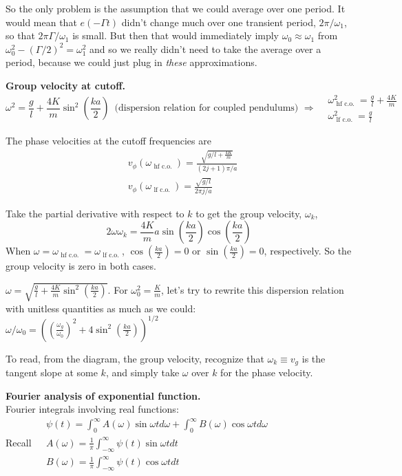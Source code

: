 \documentclass[twoside,10pt]{amsart}
\newcommand{\problemhead}[1]
  {\smallskip
   \noindent{\large\bf Problem #1.}
   \smallskip}
\begin{document}
So the only problem is the assumption that we could average over one period.  It would mean that $e(-\Gamma t)$ didn't change much over one transient period, $2\pi/\omega_1$, so that $2\pi \Gamma / \omega_1$ is small.  But then that would immediately imply $\omega_0 \approx \omega_1$ from $\omega_0^2 - (\Gamma/2)^2 = \omega_1^2$ and so we really didn't need to take the average over a period, because we could just plug in \emph{these} approximations.  

\problemhead{6.14} \textbf{ Group velocity at cutoff.} 
\[
\omega^2 = \frac{g}{l} + \frac{4K}{m} \sin^2{\left( \frac{ka}{2} \right) } \, \text{ (dispersion relation for coupled pendulums) } \Longrightarrow \begin{aligned}
  & \omega_{\text{ hf c.o. } }^2 = \frac{g}{l} + \frac{4K}{m} \\
  & \omega_{\text{ lf c.o. } }^2 = \frac{g}{l} 
\end{aligned}
\]

The phase velocities at the cutoff frequencies are
\[
\begin{aligned}
  & v_{\phi}(\omega_{ \text{ hf c.o. } }) = \frac{ \sqrt{ g/l + \frac{4K}{m} } }{ (2j+1)\pi/a } \\
  & v_{\phi}(\omega_{ \text{ lf c.o. } }) = \frac{ \sqrt{g/l}}{ 2\pi j /a} 
\end{aligned}
\]

Take the partial derivative with respect to $k$ to get the group velocity, $\omega_k$,
\[
2 \omega \omega_k = \frac{4K}{m} a \sin{ \left( \frac{ka}{2} \right)} \cos{ \left( \frac{ka}{2} \right)} 
\]
When $\omega = \omega_{ \text{ hf c.o. }} = \omega_{ \text{ lf c.o. } }$, $\cos{ \left( \frac{ka}{2} \right) } = 0$ or $\sin{ \left( \frac{ka}{2} \right) } = 0 $, respectively.  So the group velocity is zero in both cases.  

$\omega = \sqrt{ \frac{g}{l} + \frac{4K}{m} \sin^2{\left( \frac{ka}{2} \right)} }$.  For $\omega_0^2 = \frac{K}{m}$, let's try to rewrite this dispersion relation with unitless quantities as much as we could: \\
$\omega/\omega_0 = \left( \left( \frac{ \omega_g}{\omega_0} \right)^2 + 4 \sin^2{ \left( \frac{ka}{2} \right) } \right)^{1/2}$

To read, from the diagram, the group velocity, recognize that $\omega_k \equiv v_g$ is the tangent slope at some $k$, and simply take $\omega$ over $k$ for the phase velocity.  

\problemhead{6.15} \textbf{ Fourier analysis of exponential function.} \\
Fourier integrals involving real functions: \medskip \\
Recall $\begin{aligned}
  & \psi(t) = \int_0^{\infty} A(\omega) \sin{\omega t} d\omega + \int_0^{\infty} B(\omega) \cos{\omega t} d\omega \\
  & A(\omega) = \frac{1}{\pi} \int_{-\infty}^{\infty} \psi(t) \sin{\omega t} dt \\
  & B(\omega) = \frac{1}{\pi} \int_{-\infty}^{\infty} \psi(t) \cos{\omega t} dt 
\end{aligned}$ \medskip \\
\end{document}
